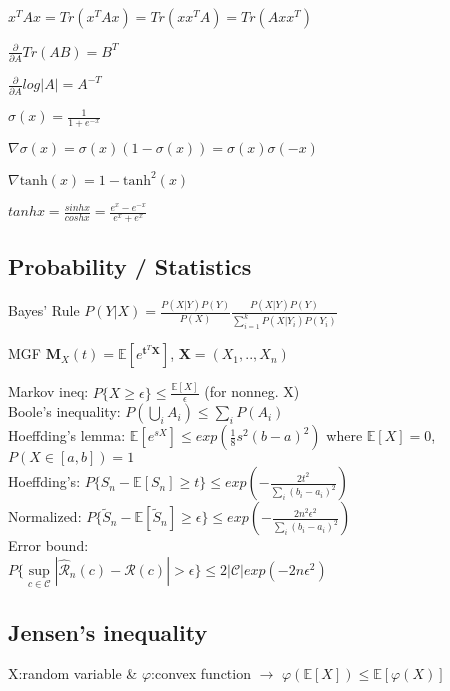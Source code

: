\begin{inparaitem}[\color{red}\textbullet]
	\item $x^T A x = Tr(x^T A x) = Tr(x x^T A) = Tr(A x x^T)$ \\
	\item $\tfrac{\partial}{\partial A} Tr(AB) {=} B^T$
	\item $\frac{\partial}{\partial A} log|A| {=} A^{-T}$ \\
	\item $\sigma(x) = \frac{1}{1+e^{-x}}$ \\
	\item $\nabla \sigma(x) = \sigma(x)(1-\sigma(x)) = \sigma(x)\sigma(-x)$\\
	\item $\nabla \text{tanh}(x) = 1-\text{tanh}^2(x)$ 
	\item $tanhx {=} \frac{sinhx}{coshx} {=} \frac{e^{x}-e^{-x}}{e^{x} + e^{x}}$
\end{inparaitem}
\subsection*{Probability / Statistics}
\begin{compactdesc}
	\item[Bayes' Rule]$ P(Y|X) = \frac{P(X|Y)P(Y)}{P(X)}\frac{P(X|Y)P(Y)}{\sum\limits^k_{i=1}P(X|Y_i)P(Y_i)}$\\
	\item[MGF] $\mathbf{M}_X(t)=\mathbb{E}[e^{\mathbf{t}^T \mathbf{X}}]$, $\mathbf{X}=(X_1,.., X_n) $
\end{compactdesc}

Markov ineq: $P\{X\geq\epsilon\} \leq \tfrac{\mathbb{E}[X]}{\epsilon}$ (for nonneg. X) \\
Boole's inequality: $P(\bigcup_i A_i) \leq \sum_i P(A_i)$ \\
Hoeffding's lemma: $\mathbb{E}[e^{sX}] \leq exp(\tfrac{1}{8}s^2(b-a)^2)$ where $\mathbb{E}[X]=0$, $P(X\in[a,b])=1$ \\
Hoeffding's: $P\{S_n {-} \mathbb{E}[S_n] {\geq} t\} {\leq} exp({-} \frac{2t^2}{\sum_i (b_i - a_i)^2})$ \\
Normalized: $P\{\widetilde{S}_n {-} \mathbb{E}[\widetilde{S}_n] {\geq} \epsilon\} {\leq} exp({-} \frac{2n^2 \epsilon ^2}{\sum_i (b_i {-} a_i)^2})$ \\
{\small Error bound: \\$P\{ \sup\limits_{c\in\mathcal{C}}|\hat{\mathcal{R}}_n(c) - \mathcal{R}(c)| > \epsilon \} \leq 2|\mathcal{C}| exp(-2n\epsilon ^2)$} 

\subsection*{Jensen's inequality}
	X:random variable \& $\varphi$:convex function $\rightarrow$ $\varphi(\mathbb{E}[X]) \leq \mathbb{E}[\varphi(X)]$
